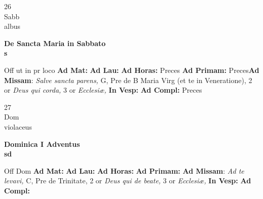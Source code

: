 \documentclass[10pt, openany]{book}
\begin{document}
    \begin{center}
        \begin{minipage}{3.5in}
            \vspace{2em}
            \begin{minipage}{0.5in}
                {\Huge 26} \\
                {\normalsize Sabb} \\
                {\normalsize albus}
            \end{minipage}
            \begin{minipage}{3.0in}
                \textbf{ \large De Sancta Maria in Sabbato \\
                \textnormal{\normalsize s}} \\ 
            \end{minipage}
            \begin{justify}Off ut in pr loco
                \textbf{Ad Mat: }
                \textbf{Ad Lau: }
                \textbf{Ad Horas: }Preces
                \textbf{Ad Primam: }Preces\textbf{Ad Missam}: \textit{Salve sancta parens,} G, Pre de B Maria Virg (et te in Veneratione), 2 or \textit{Deus qui corda,} 3 or \textit{Ecclesiæ,}  
                \textbf{In Vesp: }
                \textbf{Ad Compl: }Preces
            \end{justify}
        \end{minipage}
    \end{center}

    \begin{center}
        \begin{minipage}{3.5in}
            \vspace{2em}
            \begin{minipage}{0.5in}
                {\Huge 27} \\
                {\normalsize Dom} \\
                {\normalsize violaceus}
            \end{minipage}
            \begin{minipage}{3.0in}
                \textbf{ \large Dominica I Adventus \\
                \textnormal{\normalsize sd}} \\ 
            \end{minipage}
            \begin{justify}Off Dom
                \textbf{Ad Mat: }
                \textbf{Ad Lau: }
                \textbf{Ad Horas: }
                \textbf{Ad Primam: }\textbf{Ad Missam}: \textit{Ad te levavi,} C, Pre de Trinitate, 2 or \textit{Deus qui de beate,} 3 or \textit{Ecclesiæ,}  
                \textbf{In Vesp: }
                \textbf{Ad Compl: }
            \end{justify}
        \end{minipage}
    \end{center}
\end{document}
